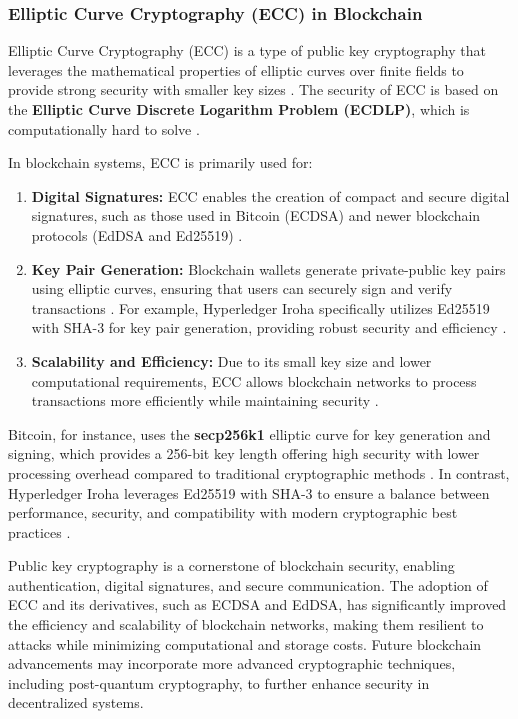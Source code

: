 \documentclass[final]{rc-book-2.14}
\begin{document}
\subsubsection{Elliptic Curve Cryptography (ECC) in Blockchain}
Elliptic Curve Cryptography (ECC) is a type of public key cryptography that leverages the mathematical properties of elliptic curves over finite fields to provide strong security with smaller key sizes \cite{koblitz1987elliptic}. The security of ECC is based on the \textbf{Elliptic Curve Discrete Logarithm Problem (ECDLP)}, which is computationally hard to solve \cite{hankerson2006guide}.

In blockchain systems, ECC is primarily used for:
\begin{enumerate}
    \item \textbf{Digital Signatures:} ECC enables the creation of compact and secure digital signatures, such as those used in Bitcoin (ECDSA) and newer blockchain protocols (EdDSA and Ed25519) \cite{johnson2001elliptic, bernstein2012high}.
    \item \textbf{Key Pair Generation:} Blockchain wallets generate private-public key pairs using elliptic curves, ensuring that users can securely sign and verify transactions \cite{wu2018blockchain}. For example, Hyperledger Iroha specifically utilizes Ed25519 with SHA-3 for key pair generation, providing robust security and efficiency \cite{hyperledger_iroha}.
    \item \textbf{Scalability and Efficiency:} Due to its small key size and lower computational requirements, ECC allows blockchain networks to process transactions more efficiently while maintaining security \cite{fan2018analysis}.
\end{enumerate}

Bitcoin, for instance, uses the \textbf{secp256k1} elliptic curve for key generation and signing, which provides a 256-bit key length offering high security with lower processing overhead compared to traditional cryptographic methods \cite{brown2010standards}. In contrast, Hyperledger Iroha leverages Ed25519 with SHA-3 to ensure a balance between performance, security, and compatibility with modern cryptographic best practices \cite{hyperledger_iroha}.

Public key cryptography is a cornerstone of blockchain security, enabling authentication, digital signatures, and secure communication. The adoption of ECC and its derivatives, such as ECDSA and EdDSA, has significantly improved the efficiency and scalability of blockchain networks, making them resilient to attacks while minimizing computational and storage costs. Future blockchain advancements may incorporate more advanced cryptographic techniques, including post-quantum cryptography, to further enhance security in decentralized systems.
\end{document}
